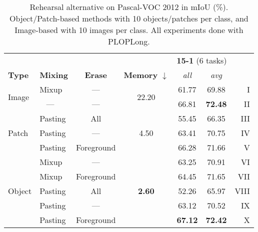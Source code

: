 \begin{table}[t]
    \centering
    \begin{tabular}{@{}llc|c|cc|r@{}}
        \toprule
                                &                 &                &                                & \multicolumn{2}{c}{\textbf{15-1} (6 tasks)}                         \\
        \textbf{Type}           & \textbf{Mixing} & \textbf{Erase} & \textbf{Memory} $\downarrow$   & \textit{all}                                & \textit{avg}   &      \\
        \midrule
        \multirow{2}{*}{Image}  & Mixup           & ---            & \multirow{2}{*}{22.20}         & 61.77                                       & 69.88          & I    \\
                                & \,\,\,\,\,---   & ---            &                                & 66.81                                       & \textbf{72.48} & II   \\
        \hline
        \multirow{3}{*}{Patch}  & Pasting         & All            & \multirow{3}{*}{4.50}          & 55.45                                       & 66.35          & III  \\
                                & Pasting         & ---            &                                & 63.41                                       & 70.75          & IV   \\
                                & Pasting         & Foreground     &                                & 66.28                                       & 71.66          & V    \\
        \hline
        \multirow{5}{*}{Object} & Mixup           & ---            & \multirow{5}{*}{\textbf{2.60}} & 63.25                                       & 70.91          & VI   \\
                                & Mixup           & Foreground     &                                & 64.45                                       & 71.65          & VII  \\
                                & Pasting         & All            &                                & 52.26                                       & 65.97          & VIII \\
                                & Pasting         & ---            &                                & 63.12                                       & 70.52          & IX   \\
                                & Pasting         & Foreground     &                                & \textbf{67.12}                              & \textbf{72.42} & X    \\
        \bottomrule
    \end{tabular}
    \caption{Rehearsal alternative on Pascal-VOC 2012 in \ac{mIoU} (\%). Object/Patch-based methods
        with 10 objects/patches per class, and Image-based with 10 images per class. All
        experiments done with PLOPLong.}
    \label{tab:seg_rehearsal_alternative}
\end{table}
